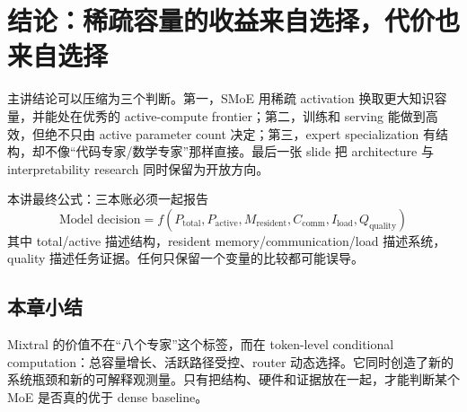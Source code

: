 \section{结论：稀疏容量的收益来自选择，代价也来自选择}

主讲结论可以压缩为三个判断。第一，SMoE 用稀疏 activation 换取更大知识容量，并能处在优秀的 active-compute frontier；第二，训练和 serving 能做到高效，但绝不只由 active parameter count 决定；第三，expert specialization 有结构，却不像“代码专家/数学专家”那样直接。最后一张 slide 把 architecture 与 interpretability research 同时保留为开放方向。


\begin{importantbox}{本讲最终公式：三本账必须一起报告}
\[
\boxed{\text{Model decision}=f(P_{\text{total}},P_{\text{active}},M_{\text{resident}},C_{\text{comm}},I_{\text{load}},Q_{\text{quality}})}
\]
其中 total/active 描述结构，resident memory/communication/load 描述系统，quality 描述任务证据。任何只保留一个变量的比较都可能误导。
\end{importantbox}


\subsection{本章小结}

Mixtral 的价值不在“八个专家”这个标签，而在 token-level conditional computation：总容量增长、活跃路径受控、router 动态选择。它同时创造了新的系统瓶颈和新的可解释观测量。只有把结构、硬件和证据放在一起，才能判断某个 MoE 是否真的优于 dense baseline。

